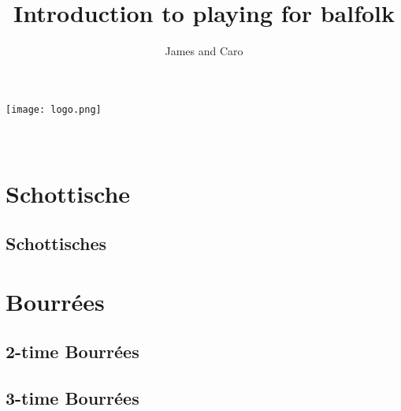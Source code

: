 \documentclass[a4paper,11pt]{article}
\begin{document}
\title{Introduction to playing for balfolk}
\author{James and Caro}
\date{}

\setmainfont{Silkscreen}

\makeatletter
    \begin{titlepage}
        \begin{center}
            \vspace*{\fill}
                \texttt{[image: logo.png]}\\[4ex]
                {\huge \bfseries  \@title }\\[2ex] 
                {\LARGE  \@author}\\[50ex] 
                {\large \@date}
        \end{center}
    \end{titlepage}
\makeatother
\thispagestyle{empty}
\newpage

\tableofcontents

\clearpage

\setcounter{page}{1} %

\section{Schottische}
\subsection{Schottisches}
\clearpage

\section{Bourrées}
\subsection{2-time Bourrées}
\clearpage
\subsection{3-time Bourrées}
\clearpage
\end{document}
